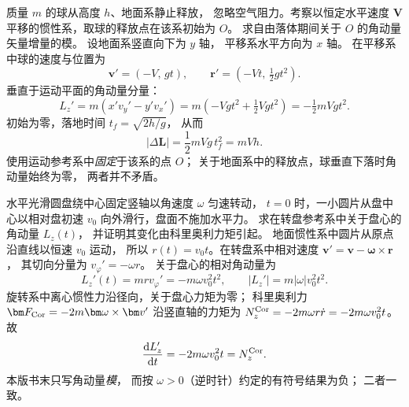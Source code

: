 质量 $m$ 的球从高度 $h$、地面系静止释放，
忽略空气阻力。考察以恒定水平速度
$\bm V$ 平移的惯性系，取球的释放点在该系初始为 $O$。
求自由落体期间关于 $O$ 的角动量矢量增量的模。
\exsolution
设地面系竖直向下为 $y$ 轴，
平移系水平方向为 $x$ 轴。
在平移系中球的速度与位置为
\[
\bm v'=(-V,\,gt),\qquad
\bm r'=(-Vt,\,\tfrac12gt^2).
\]
垂直于运动平面的角动量分量：
\[
L_z'=m(x'v_y'-y'v_x')
=m(-Vgt^2+\tfrac12Vgt^2)
=-\tfrac12mVgt^2.
\]
初始为零，落地时间 $t_f=\sqrt{2h/g}$，
从而
\[
\boxed{|\Delta\bm L|=\frac12mVg\,t_f^2=mVh}.
\]
\excheck 使用运动参考系中\emph{固定}于该系的点 $O$；
关于地面系中的释放点，球垂直下落时角动量始终为零，
两者并不矛盾。

水平光滑圆盘绕中心固定竖轴以角速度 $\omega$ 匀速转动，
$t=0$ 时，一小圆片从盘中心以相对盘初速
$v_0$ 向外滑行，盘面不施加水平力。
求在转盘参考系中关于盘心的角动量 $L_z(t)$，
并证明其变化由科里奥利力矩引起。
\exsolution
地面惯性系中圆片从原点沿直线以恒速 $v_0$ 运动，
所以 $r(t)=v_0t$。在转盘系中相对速度
$\bm v'=\bm v-\bm\omega\times\bm r$，
其切向分量为 $v_\varphi'=-\omega r$。
关于盘心的相对角动量为
\[
\boxed{L_z'(t)=mr v_\varphi'
=-m\omega v_0^2t^2},
\qquad |L_z'|=m|\omega|v_0^2t^2.
\]
旋转系中离心惯性力沿径向，关于盘心力矩为零；
科里奥利力 $\bm F_{\rm Cor}=-2m\bm\omega\times\bm v'$
沿竖直轴的力矩为
$N_z^{\rm Cor}=-2m\omega r\dot r
=-2m\omega v_0^2t$。
故
\[
\frac{\mathrm dL_z'}{\mathrm dt}
=-2m\omega v_0^2t=N_z^{\rm Cor}.
\]
\excheck 本版书末只写角动量\emph{模}，
而按 $\omega>0$（逆时针）约定的有符号结果为负；
二者一致。
